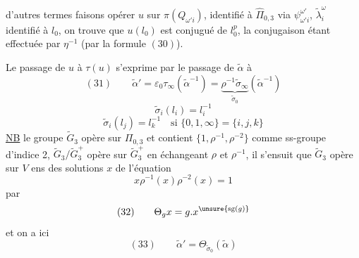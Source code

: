  d'autres termes faisons opérer $u$ sur $\pi(Q_{\omega'i})$, identifié à $\widehat\Pi_{0,3}$ via $\psi_{\omega'i}^{\omega'}$, $\widetilde\lambda_i^\omega$ identifié à $l_0$, on trouve que $u(l_0)$ est conjugué de $l_0^p$,  la conjugaison étant effectuée par $\eta^{-1}$ (par la formule $(30)$).

Le passage de $u$ à $\tau(u)$ s'exprime par
le passage de $\widetilde\alpha$ à
\[
(31)\qquad\widetilde\alpha'=\varepsilon_0\tau_\infty(\widetilde\alpha^{-1})
=\underbrace{\rho^{-1}\widetilde\sigma_\infty}_{\widetilde\sigma_0}(\widetilde\alpha^{-1})
\]
\[
\widetilde\sigma_i(l_i)=l_i^{-1}
\]
\[
\widetilde\sigma_i(l_j)=l_k^{-1}\quad\text{si }\{0,1,\infty\}=\{i,j,k\}
\]
\uline{NB} le groupe $\widetilde G_3$ opère sur $\Pi_{0,3}$ et contient \deleted{$\unsure{\xi}$}  $\{1,\rho^{-1},\rho^{-2}\}$ comme ss-groupe  d'indice 2,  $\widetilde G_3/\widetilde G_3^+$ opère sur $\widetilde G_3^+$ en échangeant $\rho$ et $\rho^{-1}$, il s'ensuit que $\widetilde G_3$ opère sur $V$ ens des solutions $x$ de l'équation
\[
x\rho^{-1}(x)\rho^{-2}(x)=1
\]
par
\[
(32)\qquad\Theta_g x=g.x^{\unsure{\operatorname{sg}(g)}}
\]
et on a ici
\[
(33)\qquad\widetilde\alpha'=\Theta_{\widetilde\sigma_0}(\widetilde\alpha)
\]
